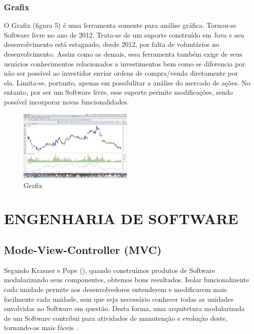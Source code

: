 \subsubsection{Grafix}

O Grafix (figura 5) é uma ferramenta somente para análise gráfica. Tornou-se Software livre no ano de 2012. Trata-se de um suporte construído em Java e seu desenvolvimento está estagnado, desde 2012, por falta de voluntários no desenvolvimento. Assim como as demais, essa ferramenta também exige de seus usuários conhecimentos relacionados a investimentos bem como se diferencia por não ser possível ao investidor enviar ordens de compra/venda diretamente por ela. Limita-se, portanto, apenas em possibilitar a análise do mercado de ações. No entanto, por ser um Software livre, esse suporte permite modificações, sendo possível incorporar novas funcionalidades.

\begin{figure}[h]
\centering
\label{f05}
\includegraphics[width=0.5\textwidth]{figuras/f05}
\caption{Grafix}

\end{figure}

\section{ENGENHARIA DE SOFTWARE}
\subsection{Mode-View-Controller (MVC)}

Segundo Krasner e Pope (\citeyear{krasner1988}), quando construímos produtos de Software modularizando seus componentes, obtemos bons resultados. Isolar funcionalmente cada unidade permite aos desenvolvedores entenderem e modificarem mais facilmente cada unidade, sem que seja necessário conhecer todas as unidades envolvidas no Software em questão. Desta forma, uma arquitetura modularizada de um Software contribui para atividades de manutenção e evolução deste, tornando-as mais fáceis \cite[p. 1]{krasner1988}.


